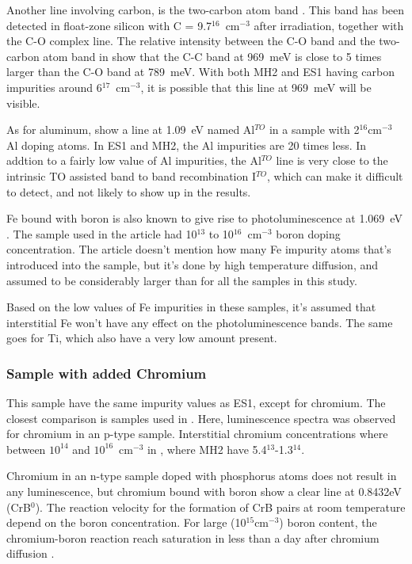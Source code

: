 Another line involving carbon, is the two-carbon atom band \cite{davies88}. This band has been detected in float-zone silicon with C = 9.7$^{16}$~cm$^{-3}$ after irradiation, together with the C-O complex line. The relative intensity between the C-O band and the two-carbon atom band in \cite{davies88} show that the C-C band at 969~meV is close to 5 times larger than the C-O band at 789~meV. With both MH2 and ES1 having carbon impurities around 6$^{17}$~cm$^{-3}$, it is possible that this line at 969~meV will be visible. 

As for aluminum, \cite{dean67} show a line at 1.09~eV named Al$^{TO}$ in a sample with 2$^{16}$cm$^{-3}$ Al doping atoms. In ES1 and MH2, the Al impurities are 20 times less. In addtion to a fairly low value of Al impurities, the Al$^{TO}$ line is very close to the intrinsic TO assisted band to band recombination I$^{TO}$, which can make it difficult to detect, and not likely to show up in the results.

Fe bound with boron is also known to give rise to photoluminescence at 1.069~eV \cite{mohring83}. The sample used in the article had  10$^{13}$ to 10$^{16}$~cm$^{-3}$ boron doping concentration. The article doesn't mention how many Fe impurity atoms that's introduced into the sample, but it's done by high temperature diffusion, and assumed to be considerably larger than for all the samples in this study. 

Based on the low values of Fe impurities in these samples, it's assumed that interstitial Fe won't have any effect on the photoluminescence bands. The same goes for Ti, which also have a very low amount present.


\subsubsection{Sample with added Chromium}

This sample have the same impurity values as ES1, except for chromium. The closest comparison is samples used in \cite{conzelmann82}. Here, luminescence spectra was observed for chromium in an p-type sample. Interstitial chromium concentrations where between $10^{14}$ and $10^{16} $~cm$^{-3}$ in \cite{conzelmann82}, where MH2 have 5.4$^{13}$-1.3$^{14}$.

Chromium in an n-type sample doped with phosphorus atoms does not result in any luminescence, but chromium bound with boron show a clear line at 0.8432eV (CrB$^0$). The reaction velocity for the formation of CrB pairs at room temperature depend on the boron concentration. For large (10$^{15}$cm$^{-3}$) boron content, the chromium-boron reaction reach saturation in less than a day after chromium diffusion \cite{conzelmann82}.

